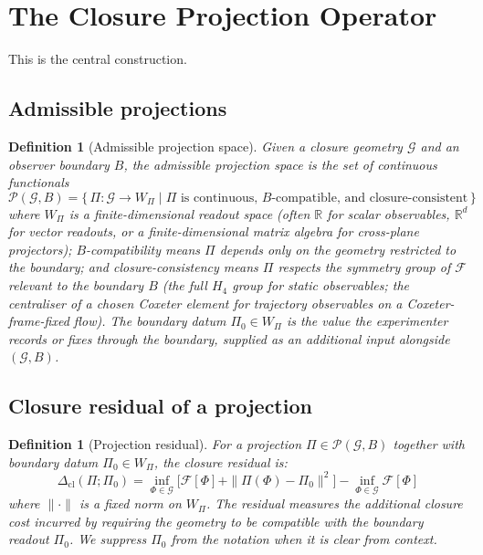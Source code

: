 \documentclass[12pt]{article}
\newtheorem{definition}[theorem]{Definition}
\newcommand{\Fcal}{\mathcal{F}}
\newcommand{\Pcal}{\mathcal{P}}
\newcommand{\Gcal}{\mathcal{G}}
\newcommand{\Dcl}{\Delta_{\mathrm{cl}}}
\begin{document}
\section{The Closure Projection Operator}\label{sec:projection}

This is the central construction.

\subsection{Admissible projections}

\begin{definition}[Admissible projection space]\label{def:projection_space}
Given a closure geometry $\Gcal$ and an observer boundary $B$, the \textit{admissible projection space} is the set of continuous functionals
\begin{equation}\label{eq:projection_space}
    \Pcal(\Gcal, B) = \bigl\{\, \Pi: \Gcal \to W_\Pi \;\big|\; \Pi \text{ is continuous, } B\text{-compatible, and closure-consistent} \,\bigr\}
\end{equation}
where $W_\Pi$ is a finite-dimensional readout space (often $\mathbb{R}$ for scalar observables, $\mathbb{R}^d$ for vector readouts, or a finite-dimensional matrix algebra for cross-plane projectors); $B$-compatibility means $\Pi$ depends only on the geometry restricted to the boundary; and closure-consistency means $\Pi$ respects the symmetry group of $\Fcal$ relevant to the boundary $B$ (the full $H_4$ group for static observables; the centraliser of a chosen Coxeter element for trajectory observables on a Coxeter-frame-fixed flow). The \emph{boundary datum} $\Pi_0 \in W_\Pi$ is the value the experimenter records or fixes through the boundary, supplied as an additional input alongside $(\Gcal, B)$.
\end{definition}

\subsection{Closure residual of a projection}

\begin{definition}[Projection residual]\label{def:residual}
For a projection $\Pi \in \Pcal(\Gcal, B)$ together with boundary datum $\Pi_0 \in W_\Pi$, the \textit{closure residual} is:
\begin{equation}\label{eq:residual}
    \Dcl(\Pi; \Pi_0) = \inf_{\Phi \in \Gcal} \bigl[\Fcal[\Phi] + \|\Pi(\Phi) - \Pi_0\|^2\bigr] - \inf_{\Phi \in \Gcal} \Fcal[\Phi]
\end{equation}
where $\|\cdot\|$ is a fixed norm on $W_\Pi$. The residual measures the additional closure cost incurred by requiring the geometry to be compatible with the boundary readout $\Pi_0$. We suppress $\Pi_0$ from the notation when it is clear from context.
\end{definition}
\end{document}
